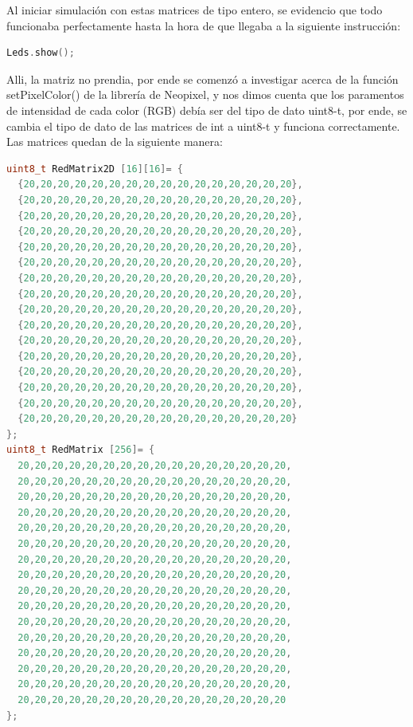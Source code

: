 \documentclass{article}
\begin{document}
Al iniciar simulación con estas matrices de tipo entero, se evidencio que todo funcionaba perfectamente hasta la hora de que llegaba a la siguiente instrucción:
\begin{lstlisting}[language=C++, label=show]
Leds.show();
\end{lstlisting}
Alli, la matriz no prendia, por ende se comenzó a investigar acerca de la función setPixelColor() de la librería de Neopixel, y nos dimos cuenta que los paramentos de intensidad de cada color (RGB) debía ser del tipo de dato uint8-t, por ende, se cambia el tipo de dato de las matrices de int a uint8-t y funciona correctamente.
Las matrices quedan de la siguiente manera:
\begin{lstlisting}[language=C++, label=codigo_matrices_uint]
uint8_t RedMatrix2D [16][16]= {
  {20,20,20,20,20,20,20,20,20,20,20,20,20,20,20,20},
  {20,20,20,20,20,20,20,20,20,20,20,20,20,20,20,20},
  {20,20,20,20,20,20,20,20,20,20,20,20,20,20,20,20},
  {20,20,20,20,20,20,20,20,20,20,20,20,20,20,20,20},
  {20,20,20,20,20,20,20,20,20,20,20,20,20,20,20,20},
  {20,20,20,20,20,20,20,20,20,20,20,20,20,20,20,20},
  {20,20,20,20,20,20,20,20,20,20,20,20,20,20,20,20},
  {20,20,20,20,20,20,20,20,20,20,20,20,20,20,20,20},
  {20,20,20,20,20,20,20,20,20,20,20,20,20,20,20,20},
  {20,20,20,20,20,20,20,20,20,20,20,20,20,20,20,20},
  {20,20,20,20,20,20,20,20,20,20,20,20,20,20,20,20},
  {20,20,20,20,20,20,20,20,20,20,20,20,20,20,20,20},
  {20,20,20,20,20,20,20,20,20,20,20,20,20,20,20,20},
  {20,20,20,20,20,20,20,20,20,20,20,20,20,20,20,20},
  {20,20,20,20,20,20,20,20,20,20,20,20,20,20,20,20},
  {20,20,20,20,20,20,20,20,20,20,20,20,20,20,20,20}
};
uint8_t RedMatrix [256]= {
  20,20,20,20,20,20,20,20,20,20,20,20,20,20,20,20,
  20,20,20,20,20,20,20,20,20,20,20,20,20,20,20,20,
  20,20,20,20,20,20,20,20,20,20,20,20,20,20,20,20,
  20,20,20,20,20,20,20,20,20,20,20,20,20,20,20,20,
  20,20,20,20,20,20,20,20,20,20,20,20,20,20,20,20,
  20,20,20,20,20,20,20,20,20,20,20,20,20,20,20,20,
  20,20,20,20,20,20,20,20,20,20,20,20,20,20,20,20,
  20,20,20,20,20,20,20,20,20,20,20,20,20,20,20,20,
  20,20,20,20,20,20,20,20,20,20,20,20,20,20,20,20,
  20,20,20,20,20,20,20,20,20,20,20,20,20,20,20,20,
  20,20,20,20,20,20,20,20,20,20,20,20,20,20,20,20,
  20,20,20,20,20,20,20,20,20,20,20,20,20,20,20,20,
  20,20,20,20,20,20,20,20,20,20,20,20,20,20,20,20,
  20,20,20,20,20,20,20,20,20,20,20,20,20,20,20,20,
  20,20,20,20,20,20,20,20,20,20,20,20,20,20,20,20,
  20,20,20,20,20,20,20,20,20,20,20,20,20,20,20,20
};
\end{lstlisting}
\end{document}

